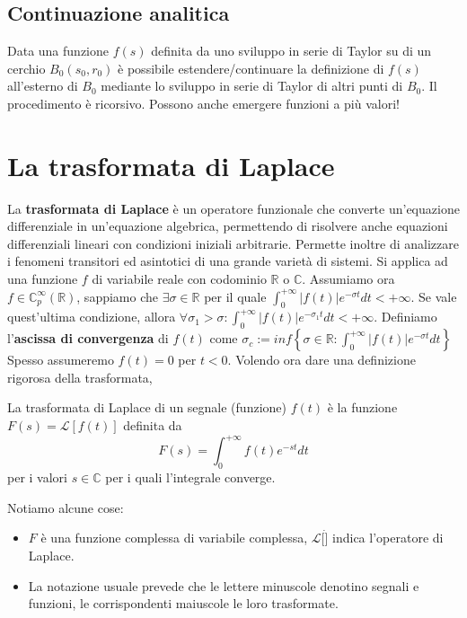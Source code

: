 \documentclass[11pt]{article}
\begin{document}
\subsection{Continuazione analitica}
Data una funzione $f(s)$ definita da uno sviluppo in serie di Taylor su di un cerchio $B_0(s_0, r_0)$ è possibile estendere/continuare la definizione di $f(s)$ all'esterno di $B_0$ mediante lo sviluppo in serie di Taylor di altri punti di $B_0$. Il procedimento è ricorsivo. Possono anche emergere funzioni a più valori!
\section{La trasformata di Laplace}
La \textbf{trasformata di Laplace} è un operatore funzionale che converte un'equazione differenziale in un'equazione algebrica, permettendo di risolvere anche equazioni differenziali lineari con condizioni iniziali arbitrarie.
Permette inoltre di analizzare i fenomeni transitori ed asintotici di una grande varietà di sistemi. 
Si applica ad una funzione $f$ di variabile reale con codominio $\mathbb{R}$ o $\mathbb{C}$. Assumiamo ora $f \in \mathbb{C}_p^\infty (\mathbb{R})$, sappiamo che $\exists \sigma \in \mathbb{R}$ per il quale $\int_0^{+\infty} |f(t)| e^{-\sigma t} dt < + \infty$. Se vale quest'ultima condizione, allora $\forall \sigma_1 > \sigma : \int_0^{+\infty} |f(t)| e^{-\sigma_1 t} dt < + \infty$. Definiamo l'\textbf{ascissa di convergenza} di $f(t)$ come $\sigma_c := inf \left\{\sigma \in \mathbb{R} : \int_0^{+\infty}|f(t)| e^{- \sigma t} dt\right\}$ Spesso assumeremo $f(t) = 0$ per $t<0$. 
Volendo ora dare una definizione rigorosa della trasformata, 
\begin{center}
    La trasformata di Laplace di un segnale (funzione) $f(t)$ è la funzione $F(s) = \mathcal{L}[f(t)]$ definita da
    \begin{displaymath}
        F(s) = \int_0^{+\infty} f(t) e^{-st} dt
    \end{displaymath}
    per i valori $s\in \mathbb{C}$ per i quali l'integrale converge.
\end{center}
Notiamo alcune cose:
\begin{itemize}
    \item $F$ è una funzione complessa di variabile complessa, $\mathcal{L}[\dot]$ indica l'operatore di Laplace.
    \item La notazione usuale prevede che le lettere minuscole denotino segnali e funzioni, le corrispondenti maiuscole le loro trasformate.
\end{itemize}
\end{document}
